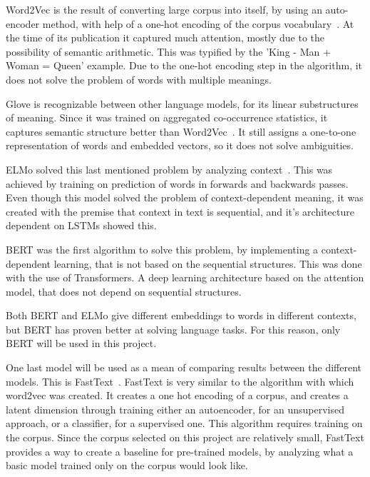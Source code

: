 Word2Vec is the result of converting large corpus into itself, by using an auto-encoder method, with help of a one-hot encoding of the corpus vocabulary~\cite{mikolov2013word2vec}. At the time of its publication it captured much attention, mostly due to the possibility of semantic arithmetic. This was typified by the 'King - Man + Woman = Queen' example. Due to the one-hot encoding step in the algorithm, it does not solve the problem of words with multiple meanings.

Glove is recognizable between other language models, for its linear substructures of meaning. Since it was trained on aggregated co-occurrence statistics, it captures semantic structure better than Word2Vec~\cite{penningto2014glove}. %
It still assigns a one-to-one representation of words and embedded vectors, so it does not solve ambiguities.

ELMo solved this last mentioned problem by analyzing context~\cite{peters2018elmo}. %
This was achieved by training on prediction of words in forwards and backwards passes. Even though this model solved the problem of context-dependent meaning, it was created with the premise that context in text is sequential, and it's architecture dependent on LSTMs showed this.

BERT was the first algorithm to solve this problem, by implementing a context-dependent learning, that is not based on the sequential structures. This was done with the use of Transformers. A deep learning architecture based on the attention model, that does not depend on sequential structures.

Both BERT and ELMo give different embeddings to words in different contexts, but BERT has proven better at solving language tasks. For this reason, only BERT will be used in this project.

One last model will be used as a mean of comparing results between the different models. This is FastText~\cite{joulin2017fasttext}. FastText is very similar to the algorithm with which word2vec was created. It creates a one hot encoding of a corpus, and creates a latent dimension through training either an autoencoder, for an unsupervised approach, or a classifier, for a supervised one. This algorithm requires training on the corpus. Since the corpus selected on this project are relatively small, FastText provides a way to create a baseline for pre-trained models, by analyzing what a basic model trained only on the corpus would look like.

